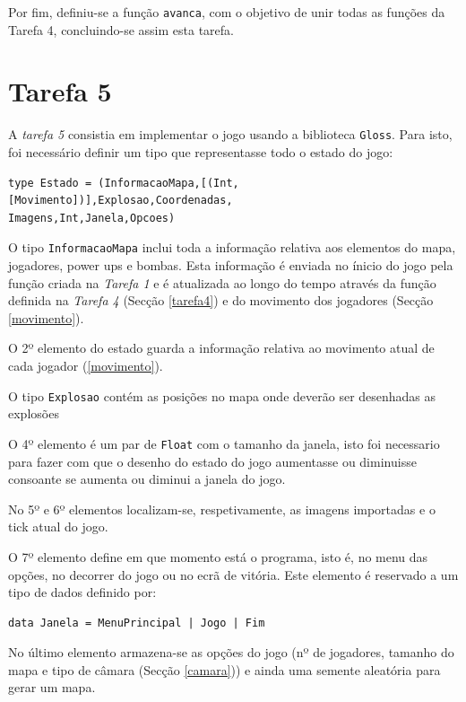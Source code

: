 \documentclass[a4paper]{article}
\begin{document}
Por fim, definiu-se a função \texttt{avanca}, com o objetivo de unir todas as funções da Tarefa 4, concluindo-se assim esta tarefa. 


\section{Tarefa 5}
\label{tarefa5}

A \emph{tarefa 5} consistia em implementar o jogo usando a biblioteca \texttt{Gloss}.
Para isto, foi necessário definir um tipo que representasse todo o estado do jogo:

\begin{verbatim}
type Estado = (InformacaoMapa,[(Int,[Movimento])],Explosao,Coordenadas,
Imagens,Int,Janela,Opcoes)
\end{verbatim}

O tipo \texttt{InformacaoMapa} inclui toda a informação relativa aos elementos do mapa,
jogadores, power ups e bombas.
Esta informação é enviada no ínicio do jogo pela função criada na \emph{Tarefa 1} e
é atualizada ao longo do tempo através da função definida na \emph{Tarefa 4} (Secção \ref{tarefa4})
e do movimento dos jogadores (Secção \ref{movimento}).

O 2º elemento do estado guarda a informação relativa ao movimento atual de cada jogador
(\ref{movimento}).

O tipo \texttt{Explosao} contém as posições no mapa onde deverão ser desenhadas as explosões

O 4º elemento é um par de \texttt{Float} com o tamanho da janela, isto foi necessario para
fazer com que o desenho do estado do jogo aumentasse ou diminuisse consoante se aumenta ou
diminui a janela do jogo.

No 5º e 6º elementos localizam-se, respetivamente, as imagens importadas e o tick atual do jogo.

O 7º elemento define em que momento está o programa, isto é, no menu das opções, no decorrer
do jogo ou no ecrã de vitória. Este elemento é reservado a um tipo de dados definido por:

\begin{verbatim}
data Janela = MenuPrincipal | Jogo | Fim
\end{verbatim}

No último elemento armazena-se as opções do jogo (nº de jogadores, tamanho do mapa e tipo de câmara (Secção \ref{camara}))
e ainda uma semente aleatória para gerar um mapa.
\end{document}
